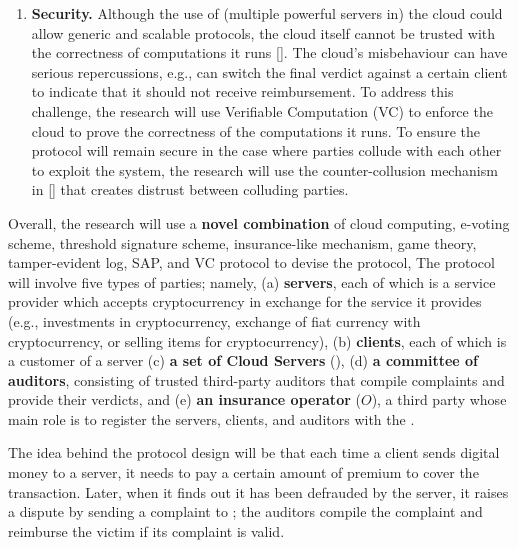 \begin{enumerate}
 \item \textbf{Security.} Although the use of (multiple powerful servers in) the cloud could allow generic and scalable protocols, the cloud itself cannot be trusted with the correctness of computations it runs \href{https://stax.strath.ac.uk/concern/theses/qr46r085k}{[\printcntr]}. The cloud's misbehaviour can have serious repercussions, e.g., can switch the final verdict against a certain client to indicate that it should not receive reimbursement. To address this challenge, the research will use Verifiable Computation (VC) to enforce the cloud to prove the correctness of the computations it runs. To ensure the protocol will remain secure in the case where parties collude with each other to exploit the system, the research will use the counter-collusion mechanism in \href{https://dl.acm.org/doi/10.1145/3133956.3134032}{[\printcntr]} that creates distrust between colluding parties. 
\end{enumerate}

Overall, the research will use a \textbf{novel combination} of cloud computing, e-voting scheme, threshold signature scheme, insurance-like mechanism, game theory, tamper-evident log, SAP, and VC protocol to devise the protocol, 
%
The protocol will involve five types of parties; namely, (a) \textbf{servers}, each of which is a service provider which accepts cryptocurrency in exchange for the service it provides (e.g., investments in cryptocurrency,  exchange of fiat currency with cryptocurrency, or selling items for cryptocurrency), (b) \textbf{clients}, each of which is a customer of a server (c) \textbf{a set of Cloud Servers} (\cs), (d) \textbf{a committee of auditors}, consisting of trusted third-party auditors that compile complaints and provide their verdicts, and (e) \textbf{an insurance operator} ($O$), a third party whose main role is to register the servers, clients, and auditors with the \cs. 

The idea behind the protocol design will be that each time a client sends digital money to a server, it needs to pay a certain amount of premium to cover the transaction. Later, when it finds out it has been defrauded by the server, it raises a dispute by sending a complaint to \cs; the auditors compile the complaint and reimburse the victim if its complaint is valid.





%



